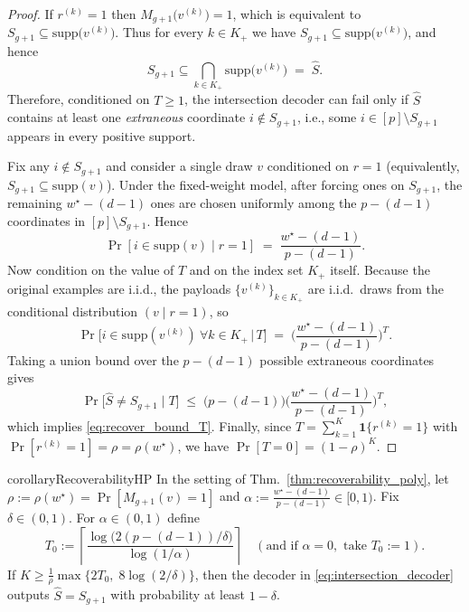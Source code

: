 \documentclass{article}
\begin{document}
\begin{proof}
If $r^{(k)}=1$ then $M_{g+1}\!\big(v^{(k)}\big)=1$, which is equivalent to
$S_{g+1}\subseteq \mathrm{supp}\!\big(v^{(k)}\big)$.
Thus for every $k\in K_+$ we have $S_{g+1}\subseteq \mathrm{supp}\!\big(v^{(k)}\big)$, and hence
\[
S_{g+1}\subseteq \bigcap_{k\in K_+}\mathrm{supp}\!\big(v^{(k)}\big) \;=\; \widehat S.
\]
Therefore, conditioned on $T\ge 1$, the intersection decoder can fail only if $\widehat S$ contains at least one
\emph{extraneous} coordinate $i\notin S_{g+1}$, i.e., some $i\in [p]\setminus S_{g+1}$ appears in every positive support.

Fix any $i\notin S_{g+1}$ and consider a single draw $v$ conditioned on $r=1$
(equivalently, $S_{g+1}\subseteq \mathrm{supp}(v)$).
Under the fixed-weight model, after forcing ones on $S_{g+1}$, the remaining $w^\star-(d-1)$ ones are chosen
uniformly among the $p-(d-1)$ coordinates in $[p]\setminus S_{g+1}$. Hence
\[
\Pr[i\in \mathrm{supp}(v)\mid r=1] \;=\; \frac{w^\star-(d-1)}{p-(d-1)}.
\]
Now condition on the value of $T$ and on the index set $K_+$ itself. Because the original examples are i.i.d.,
the payloads $\{v^{(k)}\}_{k\in K_+}$ are i.i.d.\ draws from the conditional distribution $(v\mid r=1)$, so
\[
\Pr \Big[i\in \mathrm{supp}(v^{(k)})\ \forall k\in K_+ \,\Big|\, T\Big]
\;=\;
\Big(\frac{w^\star-(d-1)}{p-(d-1)}\Big)^T.
\]
Taking a union bound over the $p-(d-1)$ possible extraneous coordinates gives
\[
\Pr\big[\widehat S\neq S_{g+1}\mid T\big]
\;\le\;
\big(p-(d-1)\big)\Big(\frac{w^\star-(d-1)}{p-(d-1)}\Big)^T,
\]
which implies \eqref{eq:recover_bound_T}. Finally, since
$T=\sum_{k=1}^K \mathbf{1}\{r^{(k)}=1\}$ with $\Pr[r^{(k)}=1]=\rho=\rho(w^\star)$, we have
$\Pr[T=0]=(1-\rho)^K$.
\end{proof}

\begin{restatable}{corollary}{RecoverabilityHP}\label{cor:recoverability_hp}
In the setting of Thm.~\ref{thm:recoverability_poly}, let
$\rho := \rho(w^\star)=\Pr[M_{g+1}(v)=1]$ and
$\alpha := \frac{w^\star-(d-1)}{p-(d-1)}\in[0,1)$.
Fix $\delta\in(0,1)$. For $\alpha\in(0,1)$ define
\[
T_0 := \left\lceil \frac{\log\!\big(2(p-(d-1))/\delta\big)}{\log(1/\alpha)} \right\rceil
\quad
(\text{and if }\alpha=0,\text{ take }T_0:=1).
\]
If $K \ge \frac{1}{\rho}\max\{2T_0,\; 8\log(2/\delta)\}$, then the decoder in \eqref{eq:intersection_decoder}
outputs $\widehat S=S_{g+1}$ with probability at least $1-\delta$.
\end{restatable}
\end{document}
